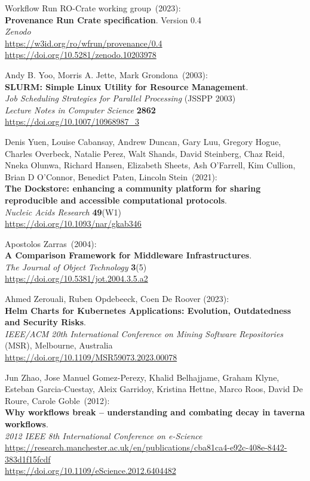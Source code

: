 \begin{thebibliography}{9}
Workflow Run RO-Crate
working group~(2023): \\
\textbf{Provenance Run Crate specification}. Version 0.4\\
\emph{Zenodo}\\
\url{https://w3id.org/ro/wfrun/provenance/0.4}\\
\url{https://doi.org/10.5281/zenodo.10203978}

Andy B. Yoo, Morris A. Jette, Mark Grondona~(2003): \\
\textbf{SLURM: Simple Linux Utility for Resource Management}.\\
\emph{Job Scheduling Strategies for Parallel Processing} (JSSPP 2003)\\
\emph{Lecture Notes in Computer Science} \textbf{2862}\\
\url{https://doi.org/10.1007/10968987_3}

Denis Yuen, Louise Cabansay, Andrew Duncan, Gary Luu, Gregory Hogue, Charles Overbeck, Natalie Perez, Walt Shands, David Steinberg, Chaz Reid, Nneka Olunwa, Richard Hansen, Elizabeth Sheets, Ash O’Farrell, Kim Cullion, Brian D O’Connor, Benedict Paten, Lincoln Stein~(2021): \\
\textbf{The Dockstore: enhancing a community platform for sharing reproducible and accessible computational protocols}.\\
\emph{Nucleic Acids Research} \textbf{49}(W1) \\
\url{https://doi.org/10.1093/nar/gkab346}

Apostolos Zarras~(2004): \\
\textbf{A {Comparison Framework} for {Middleware Infrastructures}}. \\
\emph{The Journal of Object Technology} \textbf{3}(5) \\
\url{https://doi.org/10.5381/jot.2004.3.5.a2}

Ahmed Zerouali, Ruben Opdebeeck, Coen De Roover (2023):\\
\textbf{Helm Charts for Kubernetes Applications: Evolution, Outdatedness and Security Risks}.\\
\emph{IEEE/ACM 20th International Conference on Mining Software Repositories} (MSR), Melbourne, Australia \\
\url{https://doi.org/10.1109/MSR59073.2023.00078}

Jun Zhao, Jose Manuel Gomez-Perezy, Khalid Belhajjame, Graham
Klyne, Esteban Garcia-Cuestay, Aleix Garridoy, Kristina Hettne, Marco
Roos, David De Roure, Carole Goble~(2012): \\
\textbf{Why workflows break -- understanding and combating decay in
taverna workflows}.\\
\emph{2012 IEEE 8th International Conference on e-Science}\\
\url{https://research.manchester.ac.uk/en/publications/cba81ca4-e92c-408e-8442-383d1f15fcdf}\\
\url{https://doi.org/10.1109/eScience.2012.6404482}


\end{thebibliography}
